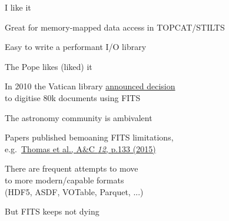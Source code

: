 \documentclass[20pt,landscape]{foils}
\newcommand{\bhref}[2]{\href{#1}{{\color{blue}#2}}}
\begin{document}
\begin{list1}
  \item I like it
  \begin{list2big}
    \item Great for memory-mapped data access in TOPCAT/STILTS
    \item Easy to write a performant I/O library
  \end{list2big}
  \item The Pope likes (liked) it
  \begin{list2big}
    \item In 2010 the Vatican library
          \bhref{https://www.vaticanlibrary.va/en/the-collections/in-digitalizzation.html}
                {announced decision} \\
          to digitise 80k documents using FITS
  \end{list2big}
  \item The astronomy community is ambivalent
  \begin{list2big}
    \item Papers published bemoaning FITS limitations,
          \\ e.g.\
          \bhref{https://ui.adsabs.harvard.edu/abs/2015A&C....12..133T}
                {Thomas et al., A\&C {\sl 12}, p.133 (2015)}
    \item There are frequent attempts to move \\
          to more modern/capable formats \\
          (HDF5, ASDF, VOTable, Parquet, ...)
    \item But FITS keeps not dying
  \end{list2big}
\end{list1}

\end{document}

